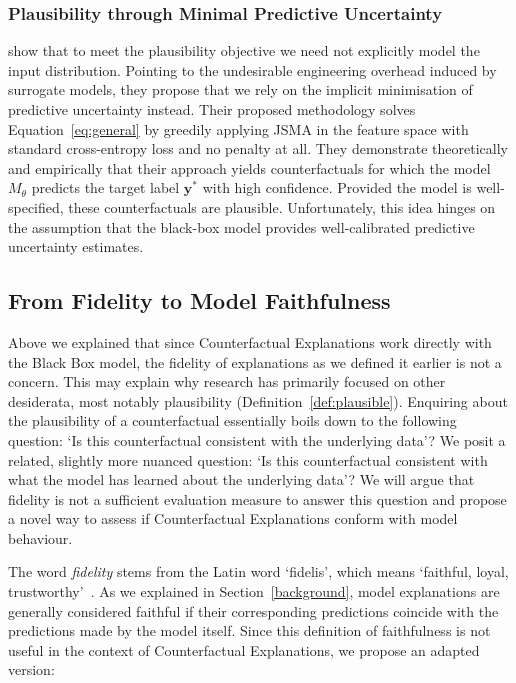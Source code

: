 \documentclass{article}
\begin{document}
\subsubsection{Plausibility through Minimal Predictive Uncertainty}

\citet{schut2021generating} show that to meet the plausibility objective we need not explicitly model the input distribution. Pointing to the undesirable engineering overhead induced by surrogate models, they propose that we rely on the implicit minimisation of predictive uncertainty instead. Their proposed methodology solves Equation~\ref{eq:general} by greedily applying JSMA in the feature space with standard cross-entropy loss and no penalty at all. They demonstrate theoretically and empirically that their approach yields counterfactuals for which the model $M_{\theta}$ predicts the target label $\mathbf{y}^*$ with high confidence. Provided the model is well-specified, these counterfactuals are plausible. Unfortunately, this idea hinges on the assumption that the black-box model provides well-calibrated predictive uncertainty estimates.

\subsection{From Fidelity to Model Faithfulness}

Above we explained that since Counterfactual Explanations work directly with the Black Box model, the fidelity of explanations as we defined it earlier is not a concern. This may explain why research has primarily focused on other desiderata, most notably plausibility (Definition~\ref{def:plausible}). Enquiring about the plausibility of a counterfactual essentially boils down to the following question: `Is this counterfactual consistent with the underlying data'? We posit a related, slightly more nuanced question: `Is this counterfactual consistent with what the model has learned about the underlying data'? We will argue that fidelity is not a sufficient evaluation measure to answer this question and propose a novel way to assess if Counterfactual Explanations conform with model behaviour. 

The word \textit{fidelity} stems from the Latin word `fidelis', which means `faithful, loyal, trustworthy'~\citep{mw2023fidelity}. As we explained in Section~\ref{background}, model explanations are generally considered faithful if their corresponding predictions coincide with the predictions made by the model itself. Since this definition of faithfulness is not useful in the context of Counterfactual Explanations, we propose an adapted version: 
\end{document}
